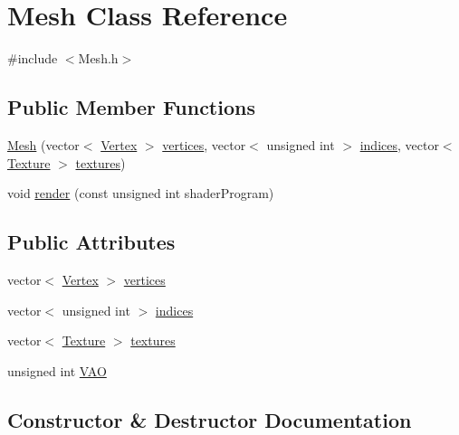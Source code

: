 \hypertarget{class_mesh}{}\section{Mesh Class Reference}
\label{class_mesh}


{\ttfamily \#include $<$Mesh.\+h$>$}

\subsection*{Public Member Functions}
\begin{DoxyCompactItemize}
\item 
\mbox{\hyperlink{class_mesh_a2d6c71adb66e5f270cee7a60c4e23018}{Mesh}} (vector$<$ \mbox{\hyperlink{struct_vertex}{Vertex}} $>$ \mbox{\hyperlink{class_mesh_abe5c05c224e47ba1e8b6393759798a9b}{vertices}}, vector$<$ unsigned int $>$ \mbox{\hyperlink{class_mesh_a464d9a1d7e7a4f67321dffc1e8b44b7d}{indices}}, vector$<$ \mbox{\hyperlink{struct_texture}{Texture}} $>$ \mbox{\hyperlink{class_mesh_a09bf4e8307bf7717c56501ca6293c6c0}{textures}})
\item 
void \mbox{\hyperlink{class_mesh_a9a6ec018bec776cb7b31fb8433c8a7e7}{render}} (const unsigned int shader\+Program)
\end{DoxyCompactItemize}
\subsection*{Public Attributes}
\begin{DoxyCompactItemize}
\item 
vector$<$ \mbox{\hyperlink{struct_vertex}{Vertex}} $>$ \mbox{\hyperlink{class_mesh_abe5c05c224e47ba1e8b6393759798a9b}{vertices}}
\item 
vector$<$ unsigned int $>$ \mbox{\hyperlink{class_mesh_a464d9a1d7e7a4f67321dffc1e8b44b7d}{indices}}
\item 
vector$<$ \mbox{\hyperlink{struct_texture}{Texture}} $>$ \mbox{\hyperlink{class_mesh_a09bf4e8307bf7717c56501ca6293c6c0}{textures}}
\item 
unsigned int \mbox{\hyperlink{class_mesh_a79afa055e485fb65b1a7aa5b8eda2940}{V\+AO}}
\end{DoxyCompactItemize}


\subsection{Constructor \& Destructor Documentation}
\mbox{\label{class_mesh_a2d6c71adb66e5f270cee7a60c4e23018}} 
